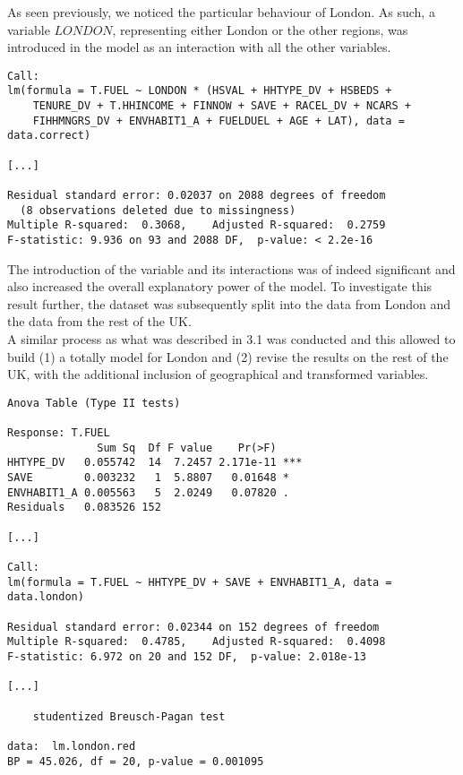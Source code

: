 \documentclass[12pt]{article}
\begin{document}
As seen previously, we noticed the particular behaviour of London. As such, a variable $LONDON$, representing either London or the other regions, was introduced in the model as an interaction with all the other variables.\\

\begin{Answer}
\begin{verbatim}
Call:
lm(formula = T.FUEL ~ LONDON * (HSVAL + HHTYPE_DV + HSBEDS + 
    TENURE_DV + T.HHINCOME + FINNOW + SAVE + RACEL_DV + NCARS + 
    FIHHMNGRS_DV + ENVHABIT1_A + FUELDUEL + AGE + LAT), data = data.correct)

[...]

Residual standard error: 0.02037 on 2088 degrees of freedom
  (8 observations deleted due to missingness)
Multiple R-squared:  0.3068,	Adjusted R-squared:  0.2759 
F-statistic: 9.936 on 93 and 2088 DF,  p-value: < 2.2e-16
\end{verbatim}
\end{Answer}

The introduction of the variable and its interactions was of indeed significant and also increased the overall explanatory power of the model. To investigate this result further, the dataset was subsequently split into the data from London and the data from the rest of the UK.\\

A similar process as what was described in 3.1 was conducted and this allowed to build (1) a totally model for London and (2) revise the results on the rest of the UK, with the additional inclusion of geographical and transformed variables.\\

\begin{Answer}
\begin{verbatim}
Anova Table (Type II tests)

Response: T.FUEL
              Sum Sq  Df F value    Pr(>F)    
HHTYPE_DV   0.055742  14  7.2457 2.171e-11 ***
SAVE        0.003232   1  5.8807   0.01648 *  
ENVHABIT1_A 0.005563   5  2.0249   0.07820 .  
Residuals   0.083526 152      

[...]

Call:
lm(formula = T.FUEL ~ HHTYPE_DV + SAVE + ENVHABIT1_A, data = data.london)

Residual standard error: 0.02344 on 152 degrees of freedom
Multiple R-squared:  0.4785,	Adjusted R-squared:  0.4098 
F-statistic: 6.972 on 20 and 152 DF,  p-value: 2.018e-13

[...]

	studentized Breusch-Pagan test

data:  lm.london.red
BP = 45.026, df = 20, p-value = 0.001095
\end{verbatim}
\end{Answer}     
\end{document}
